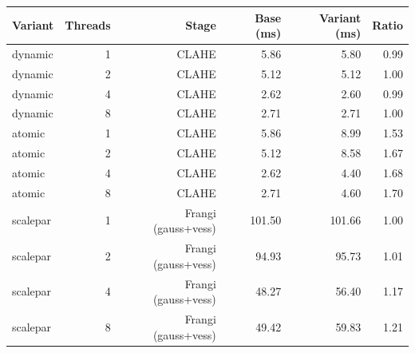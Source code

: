 \begin{tabular}{lrrrrr}
\toprule
Variant & Threads & Stage & Base (ms) & Variant (ms) & Ratio \\
\midrule
dynamic & 1 & CLAHE & 5.86 & 5.80 & 0.99 \\
dynamic & 2 & CLAHE & 5.12 & 5.12 & 1.00 \\
dynamic & 4 & CLAHE & 2.62 & 2.60 & 0.99 \\
dynamic & 8 & CLAHE & 2.71 & 2.71 & 1.00 \\
atomic & 1 & CLAHE & 5.86 & 8.99 & 1.53 \\
atomic & 2 & CLAHE & 5.12 & 8.58 & 1.67 \\
atomic & 4 & CLAHE & 2.62 & 4.40 & 1.68 \\
atomic & 8 & CLAHE & 2.71 & 4.60 & 1.70 \\
scalepar & 1 & Frangi (gauss+vess) & 101.50 & 101.66 & 1.00 \\
scalepar & 2 & Frangi (gauss+vess) & 94.93 & 95.73 & 1.01 \\
scalepar & 4 & Frangi (gauss+vess) & 48.27 & 56.40 & 1.17 \\
scalepar & 8 & Frangi (gauss+vess) & 49.42 & 59.83 & 1.21 \\
\bottomrule
\end{tabular}

